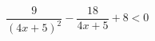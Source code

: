 \begin{ex}[type=inequality]
	\begin{condition}
		\( \dfrac{9}{(4x+5)^2}-\dfrac{18}{4x+5}+8<0 \)
	\end{condition}
\end{ex}
